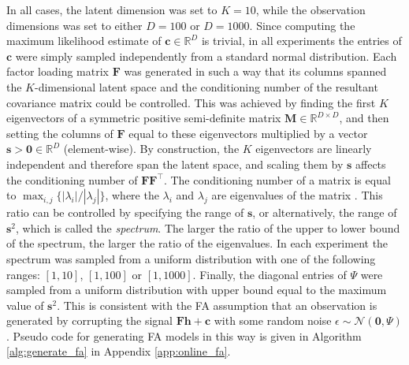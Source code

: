 \documentclass[msc,deptreport.inf]{infthesis} %
\newcommand{\matr}[1]{\mathbf{#1}}
\newcommand{\R}{\mathbb R}
\begin{document}
In all cases, the latent dimension was set to $K=10$, while the observation dimensions was set to either $D=100$ or $D=1000$. Since computing the maximum likelihood estimate of $\matr{c} \in \R^D$ is trivial, in all experiments the entries of $\matr{c}$ were simply sampled independently from a standard normal distribution. Each factor loading matrix $\matr{F}$ was generated in such a way that its columns spanned the $K$-dimensional latent space and the conditioning number of the resultant covariance matrix could be controlled. This was achieved by finding the first $K$ eigenvectors of a symmetric positive semi-definite matrix $\matr{M} \in \R^{D \times D}$, and then setting the columns of $\matr{F}$ equal to these eigenvectors multiplied by a vector $\matr{s} > \matr{0} \in \R^D$ (element-wise). By construction, the $K$ eigenvectors are linearly independent and therefore span the latent space, and scaling them by $\matr{s}$ affects the conditioning number of $\matr{F}\matr{F}^\intercal$. The conditioning number of a matrix is equal to $\max_{i, j} \{| \lambda_i | / | \lambda_j |\}$, where the $\lambda_i$ and $\lambda_j$ are eigenvalues of the matrix \cite{goodfellow2016}. This ratio can be controlled by specifying the  range of $\matr{s}$, or alternatively, the range of $\matr{s}^2$, which is called the \emph{spectrum}. The larger the ratio of the upper to lower bound of the spectrum, the larger the ratio of the eigenvalues. In each experiment the spectrum was sampled from a uniform distribution with one of the following ranges: $[1, 10]$, $[1, 100]$ or $[1, 1000]$. Finally, the diagonal entries of $\Psi$ were sampled from a uniform distribution with upper bound equal to the maximum value of $\matr{s}^2$. This is consistent with the FA assumption that an observation is generated by corrupting the signal $\matr{Fh} + \matr{c}$ with some random noise $\epsilon \sim \mathcal{N}(\matr{0}, \Psi)$. Pseudo code for generating FA models in this way is given in Algorithm \ref{alg:generate_fa} in Appendix \ref{app:online_fa}.
\end{document}
